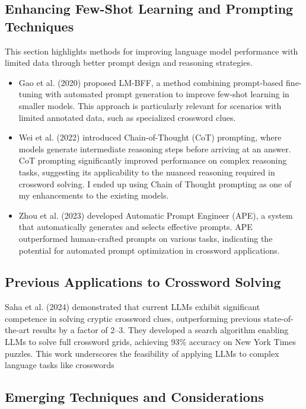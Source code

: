 \documentclass[
	a4paper, %
	10pt, %
	unnumberedsections, %
	twoside, %
]{LTJournalArticle}
\begin{document}
\subsection{Enhancing Few-Shot Learning and Prompting Techniques}

This section highlights methods for improving language model performance with limited data through better prompt design and reasoning strategies. 

\begin{itemize}
	\item Gao et al. (2020) \cite{gao2020making} proposed LM-BFF, a method combining prompt-based fine-tuning with automated prompt generation to improve few-shot learning in smaller models. This approach is particularly relevant for scenarios with limited annotated data, such as specialized crossword clues.
	\item Wei et al. (2022) \cite{wei2022chain} introduced Chain-of-Thought (CoT) prompting, where models generate intermediate reasoning steps before arriving at an answer. CoT prompting significantly improved performance on complex reasoning tasks, suggesting its applicability to the nuanced reasoning required in crossword solving. I ended up using Chain of Thought prompting as one of my enhancements to the existing models.
	\item Zhou et al. (2023) \cite{zhou2023large} developed Automatic Prompt Engineer (APE), a system that automatically generates and selects effective prompts. APE outperformed human-crafted prompts on various tasks, indicating the potential for automated prompt optimization in crossword applications.
\end{itemize}


\subsection{Previous Applications to Crossword Solving}

\noindent Saha et al. (2024) \cite{saha2024crossword} demonstrated that current LLMs exhibit significant competence in solving cryptic crossword clues, outperforming previous state-of-the-art results by a factor of 2–3. They developed a search algorithm enabling LLMs to solve full crossword grids, achieving 93\% accuracy on New York Times puzzles. This work underscores the feasibility of applying LLMs to complex language tasks like crosswords

\subsection{Emerging Techniques and Considerations}
\end{document}
